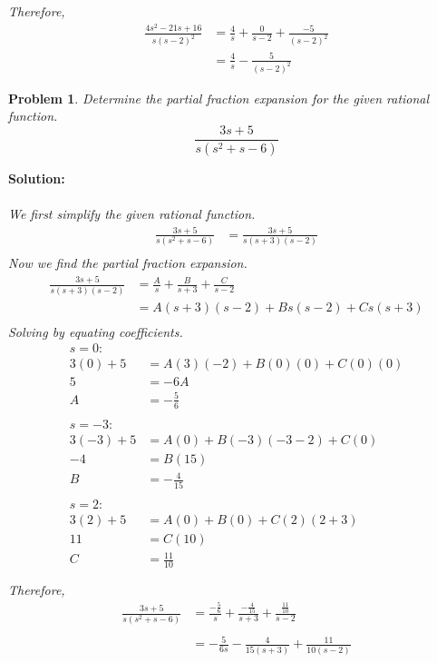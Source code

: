 \documentclass{article}
\newtheorem{problem}{Problem}
\begin{document}
    \textit{Therefore,} \\
    \begin{align*}
        \frac{4s^{2} -21s + 16}{s(s - 2)^{2}} &= \frac{4}{s} + \frac{0}{s - 2} + \frac{-5}{(s - 2)^{2}} \\
        &= \frac{4}{s} - \frac{5}{(s - 2)^{2}}
    \end{align*}

    \newpage
    \begin{problem}
        Determine the partial fraction expansion for the given rational function. 
        \[
            \frac{3s + 5}{s(s^{2} + s - 6)}
        \]
    \end{problem}
    \textbf{Solution:} \\ \\
    \textit{We first simplify the given rational function.} \\
    \begin{align*}
     \frac{3s + 5}{s(s^{2} + s - 6)} &= \frac{3s + 5}{s(s + 3)(s - 2)} \\
    \end{align*}
    \textit{Now we find the partial fraction expansion.} \\
    \begin{align*}
        \frac{3s + 5}{s(s + 3)(s - 2)} &= \frac{A}{s} + \frac{B}{s + 3} + \frac{C}{s - 2} \\
        &= A(s + 3)(s - 2) + Bs(s - 2) + Cs(s + 3) \\
    \end{align*}
    \textit{Solving by equating coefficients.} \\
    \begin{align*}
        s = 0: \\
        3(0) + 5 &= A(3)(-2) + B(0)(0) + C(0)(0) \\
        5 &= -6A \\
        A &= -\frac{5}{6} \\ \\
        s = -3: \\
        3(-3) + 5 &= A(0) + B(-3)(-3 -2) + C(0) \\
        -4 &= B(15) \\
        B &= -\frac{4}{15} \\ \\
        s = 2: \\
        3(2) + 5 &= A(0) + B(0) + C(2)(2 + 3) \\
        11 &= C(10) \\
        C &= \frac{11}{10} \\ \\
    \end{align*}
    \textit{Therefore,} \\
    \begin{align*}
        \frac{3s + 5}{s(s^{2} + s - 6)} &= \frac{-\frac{5}{6}}{s} + \frac{-\frac{4}{15}}{s + 3} + \frac{\frac{11}{10}}{s - 2} \\ \\
        &= -\frac{5}{6s} - \frac{4}{15(s + 3)} + \frac{11}{10(s - 2)}
     \end{align*} 
    \newpage
\end{document}
